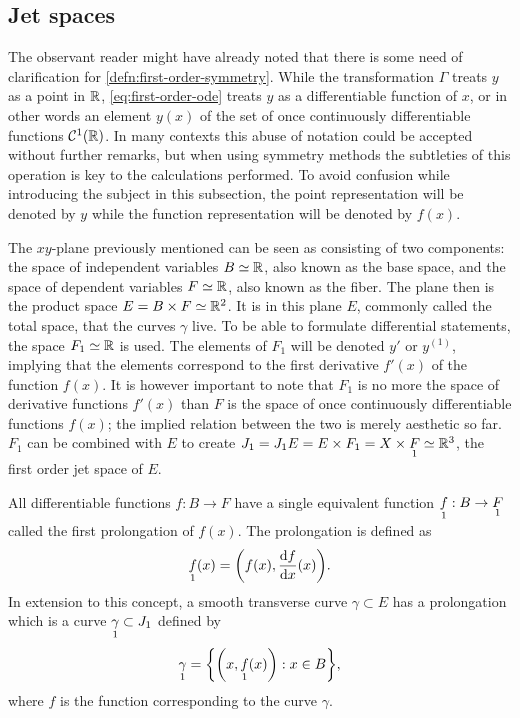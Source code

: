 \subsection{Jet spaces} \label{subsec:jet-spaces}

The observant reader might have already noted that there is some need of clarification for \cref{defn:first-order-symmetry}.
While the transformation \(\Gamma\) treats \(y\) as a point in \(\reals\), \cref{eq:first-order-ode} treats \(y\) as a differentiable function of \(x\), or in other words an element \(y(x)\) of the set of once continuously differentiable functions \(\mathcal{C}^1(\reals)\).
In many contexts this abuse of notation could be accepted without further remarks, but when using symmetry methods the subtleties of this operation is key to the calculations performed.
To avoid confusion while introducing the subject in this subsection, the point representation will be denoted by \(y\) while the function representation will be denoted by \(f(x)\).

The \(xy\)-plane previously mentioned can be seen as consisting of two components: the space of independent variables \(B \simeq \reals\), also known as the base space, and the space of dependent variables \(F \simeq \reals\), also known as the fiber.
The plane then is the product space \(E = B \times F \simeq \reals^2\).
It is in this plane \(E\), commonly called the total space, that the curves \(\gamma\) live.
To be able to formulate differential statements, the space \(F_1 \simeq \reals\) is used.
The elements of \(F_1\) will be denoted \(y'\) or \(y^{(1)}\), implying that the elements correspond to the first derivative \(f'(x)\) of the function \(f(x)\).
It is however important to note that \(F_1\) is no more the space of derivative functions \(f'(x)\) than \(F\) is the space of once continuously differentiable functions \(f(x)\); the implied relation between the two is merely aesthetic so far.
\(F_1\) can be combined with \(E\) to create \(J_1 = J_1 E = E \times F_1 = X \times \prolong{F}{1} \simeq \reals^3\), the first order jet space of \(E\).

All differentiable functions \(f: B \to F\) have a single equivalent function \(\prolong{f}{1}: B \to \prolong{F}{1}\) called the first prolongation of \(f(x)\).
The prolongation is defined as
\begin{equation}
  \prolong{f}{1}(x) = \qty(f(x), \diff{f}{x}(x)).
\end{equation}
In extension to this concept, a smooth transverse curve \(\gamma \subset E\) has a prolongation which is a curve \(\prolong{\gamma}{1} \subset J_1\) defined by
\begin{equation}
  \prolong{\gamma}{1} = \qty{\qty(x, \prolong{f}{1}(x)): x \in B},
\end{equation}
where \(f\) is the function corresponding to the curve \(\gamma\).

